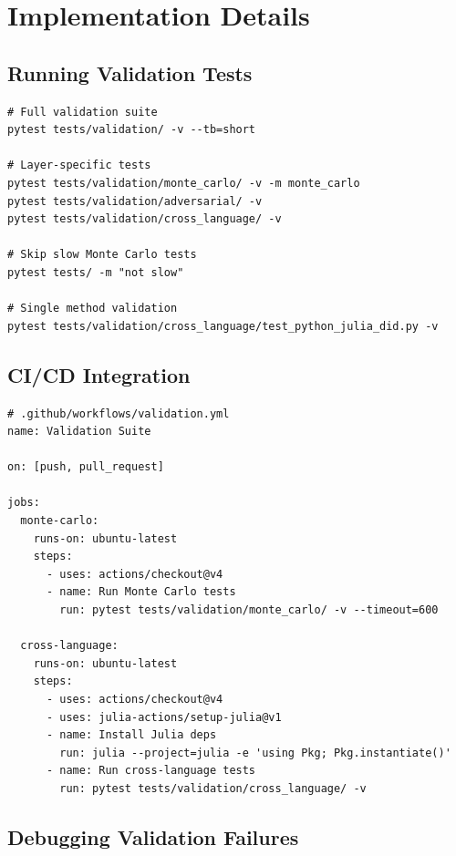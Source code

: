 \section{Implementation Details}

\subsection{Running Validation Tests}

\begin{verbatim}
# Full validation suite
pytest tests/validation/ -v --tb=short

# Layer-specific tests
pytest tests/validation/monte_carlo/ -v -m monte_carlo
pytest tests/validation/adversarial/ -v
pytest tests/validation/cross_language/ -v

# Skip slow Monte Carlo tests
pytest tests/ -m "not slow"

# Single method validation
pytest tests/validation/cross_language/test_python_julia_did.py -v
\end{verbatim}

\subsection{CI/CD Integration}

\begin{verbatim}
# .github/workflows/validation.yml
name: Validation Suite

on: [push, pull_request]

jobs:
  monte-carlo:
    runs-on: ubuntu-latest
    steps:
      - uses: actions/checkout@v4
      - name: Run Monte Carlo tests
        run: pytest tests/validation/monte_carlo/ -v --timeout=600

  cross-language:
    runs-on: ubuntu-latest
    steps:
      - uses: actions/checkout@v4
      - uses: julia-actions/setup-julia@v1
      - name: Install Julia deps
        run: julia --project=julia -e 'using Pkg; Pkg.instantiate()'
      - name: Run cross-language tests
        run: pytest tests/validation/cross_language/ -v
\end{verbatim}

\subsection{Debugging Validation Failures}

